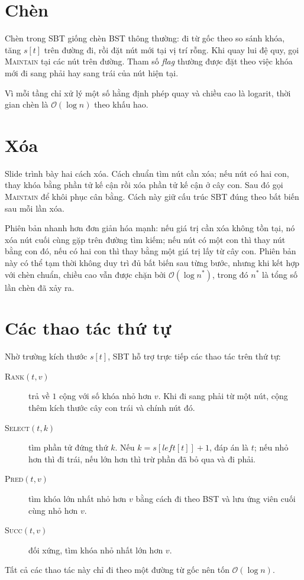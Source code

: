 \documentclass[11pt]{article}
\newcommand{\Oh}{\mathcal{O}}
\begin{document}
\section{Chèn}

Chèn trong SBT giống chèn BST thông thường: đi từ gốc theo so sánh khóa, tăng
\(s[t]\) trên đường đi, rồi đặt nút mới tại vị trí rỗng. Khi quay lui đệ quy,
gọi \textsc{Maintain} tại các nút trên đường. Tham số \textit{flag} thường
được đặt theo việc khóa mới đi sang phải hay sang trái của nút hiện tại.

Vì mỗi tầng chỉ xử lý một số hằng định phép quay và chiều cao là logarit,
thời gian chèn là \(\Oh(\log n)\) theo khấu hao.

\section{Xóa}

Slide trình bày hai cách xóa. Cách chuẩn tìm nút cần xóa; nếu nút có hai con,
thay khóa bằng phần tử kế cận rồi xóa phần tử kế cận ở cây con. Sau đó gọi
\textsc{Maintain} để khôi phục cân bằng. Cách này giữ cấu trúc SBT đúng theo
bất biến sau mỗi lần xóa.

Phiên bản nhanh hơn đơn giản hóa mạnh: nếu giá trị cần xóa không tồn tại, nó
xóa nút cuối cùng gặp trên đường tìm kiếm; nếu nút có một con thì thay nút
bằng con đó, nếu có hai con thì thay bằng một giá trị lấy từ cây con. Phiên
bản này có thể tạm thời không duy trì đủ bất biến sau từng bước, nhưng khi
kết hợp với chèn chuẩn, chiều cao vẫn được chặn bởi \(\Oh(\log n^*)\), trong
đó \(n^*\) là tổng số lần chèn đã xảy ra.

\section{Các thao tác thứ tự}

Nhờ trường kích thước \(s[t]\), SBT hỗ trợ trực tiếp các thao tác trên thứ
tự:
\begin{description}
  \item[\textsc{Rank}$(t,v)$] trả về \(1\) cộng với số khóa nhỏ hơn \(v\).
  Khi đi sang phải từ một nút, cộng thêm kích thước cây con trái và chính nút
  đó.
  \item[\textsc{Select}$(t,k)$] tìm phần tử đứng thứ \(k\). Nếu
  \(k=s[\mathit{left}[t]]+1\), đáp án là \(t\); nếu nhỏ hơn thì đi trái, nếu
  lớn hơn thì trừ phần đã bỏ qua và đi phải.
  \item[\textsc{Pred}$(t,v)$] tìm khóa lớn nhất nhỏ hơn \(v\) bằng cách đi
  theo BST và lưu ứng viên cuối cùng nhỏ hơn \(v\).
  \item[\textsc{Succ}$(t,v)$] đối xứng, tìm khóa nhỏ nhất lớn hơn \(v\).
\end{description}
Tất cả các thao tác này chỉ đi theo một đường từ gốc nên tốn \(\Oh(\log n)\).
\end{document}
